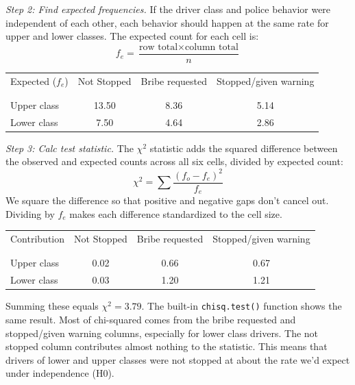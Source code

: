 \documentclass[12pt,letterpaper]{article}
\begin{document}
\begin{enumerate}
	\noindent \textit{Step 2: Find expected frequencies.} If the driver class and police behavior were independent of each other, each behavior should happen at the same rate for upper and lower classes. The expected count for each cell is: \[ f_e = \frac{\text{row total} \times \text{column total}}{n} \]  
	\begin{table}[H]
		\centering
		\begin{tabular}{l | c c c }
			Expected ($f_e$) & Not Stopped & Bribe requested & Stopped/given warning \\
			\\[-1.8ex] 
			\hline \\[-1.8ex]
			Upper class & 13.50 & 8.36 & 5.14 \\
			Lower class & 7.50 & 4.64 & 2.86 \\
			\hline
		\end{tabular}
	\end{table}
	\noindent \textit{Step 3: Calc test statistic.} The $\chi^2$ statistic adds the squared difference between the observed and expected counts across all six cells, divided by expected count: \[ \chi^2 = \sum \frac{(f_o - f_e)^2}{f_e} \] We square the difference so that positive and negative gaps don’t cancel out. Dividing by $f_e$ makes each difference standardized to the cell size. 
	\begin{table}[H]
		\centering
		\begin{tabular}{l | c c c }
		    Contribution & Not Stopped & Bribe requested & Stopped/given warning \\
			\\[-1.8ex] 
			\hline \\[-1.8ex]
			Upper class & 0.02 & 0.66 & 0.67 \\
			Lower class & 0.03 & 1.20 & 1.21 \\
			\hline
		\end{tabular}
	\end{table}
	\noindent Summing these equals $\chi^2 = 3.79$. The built-in \texttt{chisq.test()} function shows the same result. Most of chi-squared comes from the bribe requested and stopped/given warning columns, especially for lower class drivers. The not stopped column contributes almost nothing to the statistic. This means that drivers of lower and upper classes were not stopped at about the rate we’d expect under independence (H0). 
	

\end{enumerate}
\end{document}
